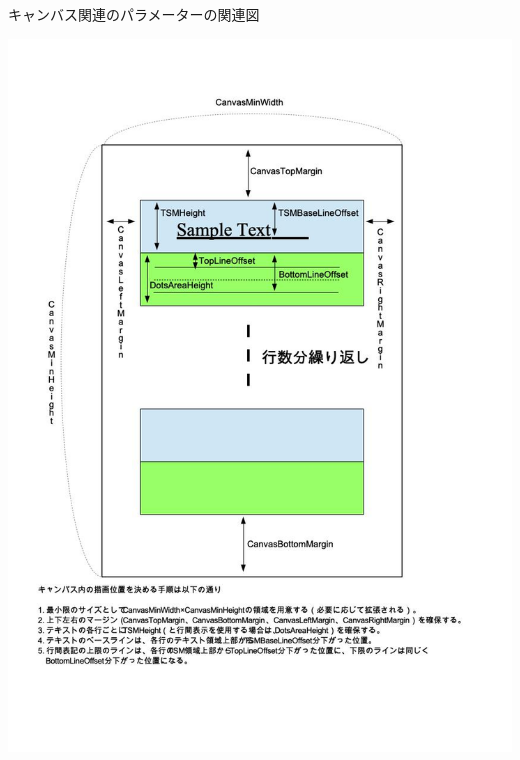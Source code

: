 \begin{table}[h]\label{CanvasParms}
\medskip
\caption{キャンバス関連のパラメーターの関連図}
\begin{center}
	\includegraphics[width=16cm]{tuneEditorCanvasParms.jpg}
 \end{center}
\medskip

\end{table}




